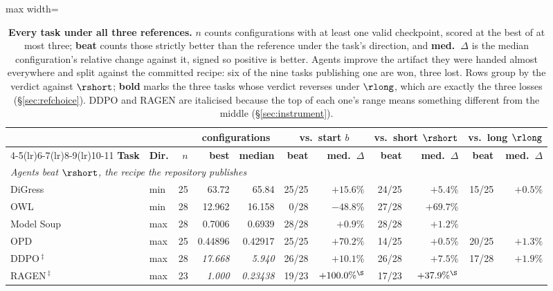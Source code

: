 \begin{table}[t]
\centering
\caption{\textbf{Every task under all three references.} $n$ counts configurations with at least one
valid checkpoint, scored at the best of at most three; \textbf{beat} counts those strictly better than
the reference under the task's direction, and \textbf{med.\ $\Delta$} is the median configuration's
relative change against it, signed so positive is better. Agents improve the artifact they were handed
almost everywhere and split against the committed recipe: six of the nine tasks publishing one are won,
three lost. Rows group by the verdict against $\rshort$; \textbf{bold} marks the three tasks whose
verdict reverses under $\rlong$, which are exactly the three losses (\S\ref{sec:refchoice}). DDPO and
RAGEN are italicised because the top of each one's range means something different from the middle
(\S\ref{sec:instrument}).}
\label{tab:main}
\small
\begin{adjustbox}{max width=\linewidth}
\begin{tabular}{llrrrrrrrrr}
\toprule
& & & \multicolumn{2}{c}{\textbf{configurations}}
& \multicolumn{2}{c}{\textbf{vs.\ start $b$}}
& \multicolumn{2}{c}{\textbf{vs.\ short $\rshort$}}
& \multicolumn{2}{c}{\textbf{vs.\ long $\rlong$}} \\
\cmidrule(lr){4-5}\cmidrule(lr){6-7}\cmidrule(lr){8-9}\cmidrule(lr){10-11}
\textbf{Task} & \textbf{Dir.} & \textbf{$n$} & \textbf{best} & \textbf{median}
& \textbf{beat} & \textbf{med.\ $\Delta$} & \textbf{beat} & \textbf{med.\ $\Delta$}
& \textbf{beat} & \textbf{med.\ $\Delta$} \\
\midrule
\multicolumn{11}{l}{\emph{Agents beat $\rshort$, the recipe the repository publishes}} \\
DiGress          & min & 25 & 63.72 & 65.84 & 25/25 & $+15.6\%$ & 24/25 & $+5.4\%$ & 15/25 & $+0.5\%$ \\
OWL              & min & 28 & 12.962 & 16.158 & 0/28 & $-48.8\%$ & 27/28 & $+69.7\%$ & \na{} & \na{} \\
Model Soup       & max & 28 & 0.7006 & 0.6939 & 28/28 & $+0.9\%$ & 28/28 & $+1.2\%$ & \na{} & \na{} \\
OPD              & max & 25 & 0.44896 & 0.42917 & 25/25 & $+70.2\%$ & 14/25 & $+0.5\%$ & 20/25 & $+1.3\%$ \\
DDPO\,\emph{$^\ddagger$} & max & 28 & \emph{17.668} & \emph{5.940} & 26/28 & $+10.1\%$ & 26/28 & $+7.5\%$ & 17/28 & $+1.9\%$ \\
RAGEN\,\emph{$^\ddagger$} & max & 23 & \emph{1.000} & \emph{0.23438} & 19/23 & $+100.0\%^\S$ & 17/23 & $+37.9\%^\S$ & \na{} & \na{} \\

\end{tabular}
\end{adjustbox}
\end{table}
